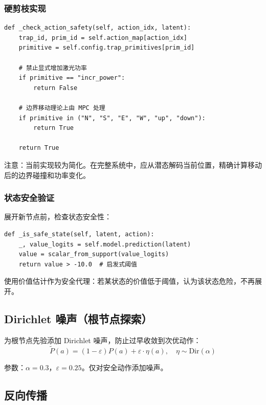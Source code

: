 \documentclass[UTF8, a4paper]{ctexart}
\begin{document}
\subsubsection{硬剪枝实现}

\begin{lstlisting}
def _check_action_safety(self, action_idx, latent):
    trap_id, prim_id = self.action_map[action_idx]
    primitive = self.config.trap_primitives[prim_id]
    
    # 禁止显式增加激光功率
    if primitive == "incr_power":
        return False
    
    # 边界移动理论上由 MPC 处理
    if primitive in ("N", "S", "E", "W", "up", "down"):
        return True
    
    return True
\end{lstlisting}

注意：当前实现较为简化。在完整系统中，应从潜态解码当前位置，精确计算移动后的边界碰撞和功率变化。

\subsubsection{状态安全验证}

展开新节点前，检查状态安全性：
\begin{lstlisting}
def _is_safe_state(self, latent, action):
    _, value_logits = self.model.prediction(latent)
    value = scalar_from_support(value_logits)
    return value > -10.0  # 启发式阈值
\end{lstlisting}

使用价值估计作为安全代理：若某状态的价值低于阈值，认为该状态危险，不再展开。

\subsection{Dirichlet 噪声（根节点探索）}

为根节点先验添加 Dirichlet 噪声，防止过早收敛到次优动作：
\begin{equation}
\tilde{P}(a) = (1 - \varepsilon) P(a) + \varepsilon \cdot \eta(a), \quad \eta \sim \text{Dir}(\alpha)
\end{equation}

参数：$\alpha = 0.3$，$\varepsilon = 0.25$。仅对安全动作添加噪声。

\subsection{反向传播}
\end{document}
